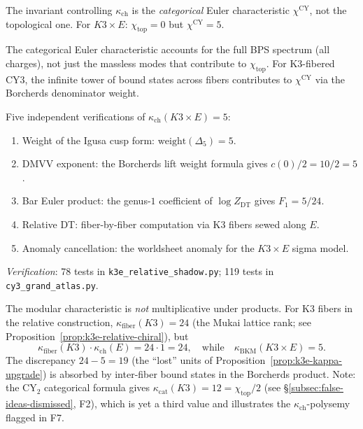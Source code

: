 \documentclass[11pt]{article}
\newcommand{\CY}{\mathrm{CY}}
\newcommand{\DT}{\mathrm{DT}}
\begin{document}
\begin{proposition}
\label{wn:prop:categorical-euler}
The invariant controlling $\kappa_{\mathrm{ch}}$ is the \emph{categorical} Euler characteristic $\chi^{\CY}$, not the topological one. For $K3 \times E$: $\chi_{\mathrm{top}} = 0$ but $\chi^{\CY} = 5$.

The categorical Euler characteristic accounts for the full BPS spectrum (all charges), not just the massless modes that contribute to $\chi_{\mathrm{top}}$. For K3-fibered CY3, the infinite tower of bound states across fibers contributes to $\chi^{\CY}$ via the Borcherds denominator weight.

Five independent verifications of $\kappa_{\mathrm{ch}}(K3 \times E) = 5$:
\begin{enumerate}[label=\textup{(\alph*)}]
 \item Weight of the Igusa cusp form: $\mathrm{weight}(\Delta_5) = 5$.
 \item DMVV exponent: the Borcherds lift weight formula gives $c(0)/2 = 10/2 = 5$.
 \item Bar Euler product: the genus-$1$ coefficient of $\log Z_{\DT}$ gives $F_1 = 5/24$.
 \item Relative DT: fiber-by-fiber computation via K3 fibers sewed along $E$.
 \item Anomaly cancellation: the worldsheet anomaly for the $K3 \times E$ sigma model.
\end{enumerate}

\noindent\textit{Verification}: 78 tests in \texttt{k3e\_relative\_shadow.py}; 119 tests in \texttt{cy3\_grand\_atlas.py}.
\end{proposition}

\begin{warning}
\label{warn:kappa-not-multiplicative}
The modular characteristic is \emph{not} multiplicative under products. For K3 fibers in the relative construction, $\kappa_{\mathrm{fiber}}(K3) = 24$ (the Mukai lattice rank; see Proposition~\ref{prop:k3e-relative-chiral}), but
\[
 \kappa_{\mathrm{fiber}}(K3) \cdot \kappa_{\mathrm{ch}}(E) = 24 \cdot 1 = 24, \quad\text{while}\quad \kappa_{\mathrm{BKM}}(K3 \times E) = 5.
\]
The discrepancy $24 - 5 = 19$ (the ``lost'' units of Proposition~\ref{prop:k3e-kappa-upgrade}) is absorbed by inter-fiber bound states in the Borcherds product. Note: the CY$_2$ categorical formula gives $\kappa_{\mathrm{cat}}(K3) = 12 = \chi_{\mathrm{top}}/2$ (see \S\ref{subsec:false-ideas-dismissed}, F2), which is yet a third value and illustrates the $\kappa_{\mathrm{ch}}$-polysemy flagged in F7.
\end{warning}
\end{document}
